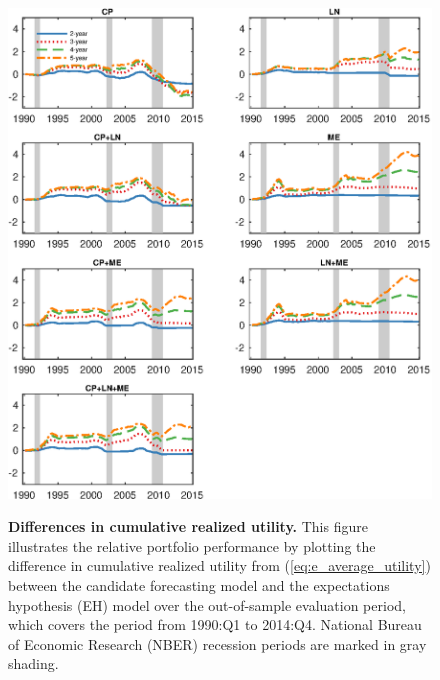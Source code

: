 \documentclass[12pt,letterpaper,leqno,doublespacing]{article}
\begin{document}
\clearpage
\begin{figure}[htbp]
    \caption{
        \textbf{Differences in cumulative realized utility.} \newline
        This figure illustrates the relative portfolio performance by plotting the difference in cumulative realized utility from (\ref{eq:e_average_utility}) between the candidate forecasting model and the expectations hypothesis (EH) model  over the out-of-sample evaluation period, which covers the period from 1990:Q1 to 2014:Q4. National Bureau of Economic Research (NBER) recession periods are marked in gray shading.
    }
    \centering
    \includegraphics[scale=1]{figures/e_dcutil.eps}
    \label{Fig:e_dcutil}
\end{figure}

\end{document}
